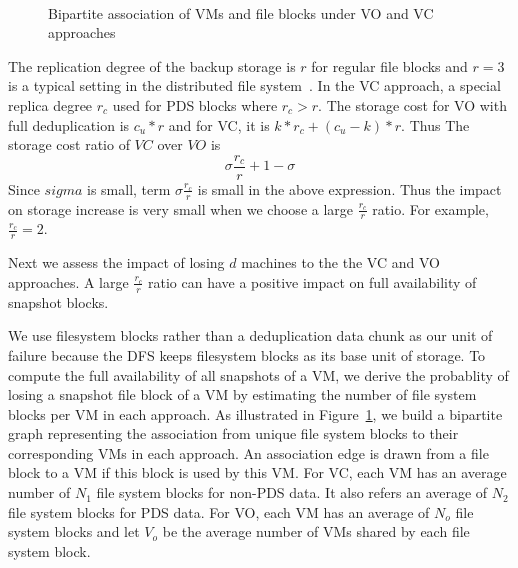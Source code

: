 \begin{figure}
    \centering
    \\
    \caption{Bipartite association of VMs and file blocks under VO and VC approaches}
    \label{fig:share}
\end{figure}

The replication degree of the backup storage 
is $r$ for regular file blocks and $r=3$ is a typical setting in the distributed
file system~\cite{Hadoop,GFS}.
In the VC approach, a special replica degree $r_c$ used for PDS blocks where $r_c>r$. 
The storage cost for VO with full deduplication is $c_u *r$ and for VC, it is
$ k*r_c  + (c_u-k)*r$. Thus The storage cost ratio of $VC$ over $VO$ is 
\[
\sigma \frac{r_c}{r} + 1-\sigma
\]
Since $sigma$ is small,  term $\sigma \frac{r_c}{r}$ is small in the above expression.  
Thus the impact on storage increase is very small when we choose a large $\frac{r_c}{r}$ ratio. 
For example, $\frac{r_c}{r}=2$. 

Next we  assess  the impact of losing $d$ machines 
to the the VC and VO approaches.  
A large $\frac{r_c}{r}$ ratio can have a positive impact on full availability of snapshot blocks.

We use filesystem blocks rather than a deduplication
data chunk as our unit of failure because the DFS keeps
filesystem blocks as its base unit of storage.
To  compute the full availability of all snapshots of a VM, we derive
the probablity of losing a snapshot file block of a VM by
estimating the number of file system blocks per VM in each approach.
As illustrated in Figure~\ref{fig:share},
we build a bipartite graph representing the association from unique file system blocks
to their corresponding VMs in each approach. An association edge is  drawn  from a file block  to a VM 
if this block is used by this VM. 
For VC, each VM has an 
average number of $N_1$ file system blocks for non-PDS data. 
It also refers  an average of   $N_2$ file system blocks for PDS data. 
For VO, each VM has an average  of  $N_o$ file system blocks
and let $V_o$ be the average number of VMs shared by each file system block.

